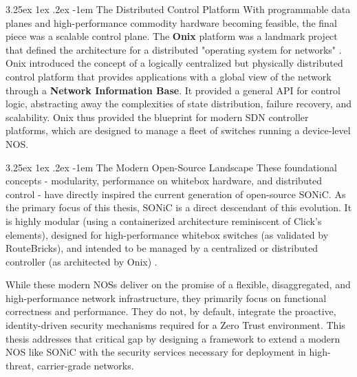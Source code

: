 \documentclass[12pt, a4paper, reqno, oneside]{book}
\makeatletter
\renewcommand\paragraph{\@startsection{paragraph}{5}{\z@}%
  {3.25ex \@plus1ex \@minus.2ex}%
  {-1em}%
  {\normalfont\normalsize\bfseries}}
\makeatother
\begin{document}
\paragraph{The Distributed Control Platform}
With programmable data planes and high-performance commodity hardware becoming feasible, the final piece was a scalable control plane. The \textbf{Onix} platform was a landmark project that defined the architecture for a distributed "operating system for networks" \cite{koponen2010onix}. Onix introduced the concept of a logically centralized but physically distributed control platform that provides applications with a global view of the network through a \textbf{Network Information Base}. It provided a general API for control logic, abstracting away the complexities of state distribution, failure recovery, and scalability. Onix thus provided the blueprint for modern SDN controller platforms, which are designed to manage a fleet of switches running a device-level NOS.

\paragraph{The Modern Open-Source Landscape}
These foundational concepts - modularity, performance on whitebox hardware, and distributed control - have directly inspired the current generation of open-source SONiC. As the primary focus of this thesis, SONiC is a direct descendant of this evolution. It is highly modular (using a containerized architecture reminiscent of Click's elements), designed for high-performance whitebox switches (as validated by RouteBricks), and intended to be managed by a centralized or distributed controller (as architected by Onix) \cite{alsabeh2020leveraging}.

While these modern NOSs deliver on the promise of a flexible, disaggregated, and high-performance network infrastructure, they primarily focus on functional correctness and performance. They do not, by default, integrate the proactive, identity-driven security mechanisms required for a Zero Trust environment. This thesis addresses that critical gap by designing a framework to extend a modern NOS like SONiC with the security services necessary for deployment in high-threat, carrier-grade networks.

\end{document}
